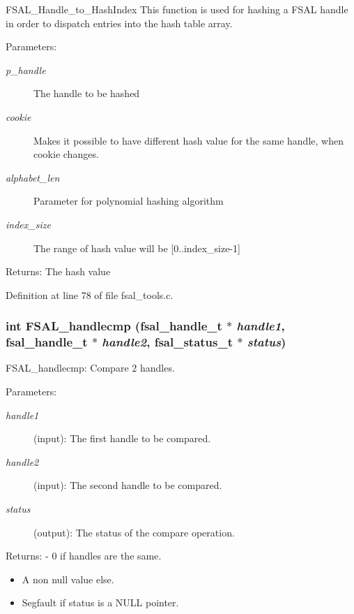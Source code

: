 FSAL\_\-Handle\_\-to\_\-HashIndex This function is used for hashing a FSAL handle in order to dispatch entries into the hash table array.

\begin{Desc}
\item[Parameters:]
\begin{description}
\item[{\em p\_\-handle}]The handle to be hashed \item[{\em cookie}]Makes it possible to have different hash value for the same handle, when cookie changes. \item[{\em alphabet\_\-len}]Parameter for polynomial hashing algorithm \item[{\em index\_\-size}]The range of hash value will be [0..index\_\-size-1]\end{description}
\end{Desc}
\begin{Desc}
\item[Returns:]The hash value \end{Desc}


Definition at line 78 of file fsal\_\-tools.c.
\subsubsection[{FSAL\_\-handlecmp}]{\setlength{\rightskip}{0pt plus 5cm}int FSAL\_\-handlecmp (fsal\_\-handle\_\-t $\ast$ {\em handle1}, \/  fsal\_\-handle\_\-t $\ast$ {\em handle2}, \/  fsal\_\-status\_\-t $\ast$ {\em status})}\label{fsal__tools_8c_808e39546ae8080e331e6d09255d1fc8}


FSAL\_\-handlecmp: Compare 2 handles.

\begin{Desc}
\item[Parameters:]
\begin{description}
\item[{\em handle1}](input): The first handle to be compared. \item[{\em handle2}](input): The second handle to be compared. \item[{\em status}](output): The status of the compare operation.\end{description}
\end{Desc}
\begin{Desc}
\item[Returns:]- 0 if handles are the same.\begin{itemize}
\item A non null value else.\item Segfault if status is a NULL pointer. \end{itemize}
\end{Desc}


